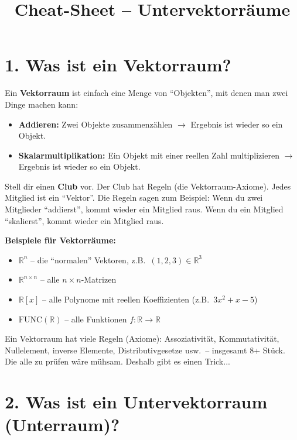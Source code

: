 \documentclass[a4paper,12pt]{article}
\title{Cheat-Sheet -- Untervektorr\"aume}
\author{}
\date{}
\begin{document}
\maketitle

\section*{1. Was ist ein Vektorraum?}

Ein \textbf{Vektorraum} ist einfach eine Menge von ``Objekten'', mit denen man zwei Dinge machen kann:
\begin{itemize}
    \item \textbf{Addieren:} Zwei Objekte zusammenz\"ahlen $\rightarrow$ Ergebnis ist wieder so ein Objekt.
    \item \textbf{Skalarmultiplikation:} Ein Objekt mit einer reellen Zahl multiplizieren $\rightarrow$ Ergebnis ist wieder so ein Objekt.
\end{itemize}

\begin{analogie}
Stell dir einen \textbf{Club} vor. Der Club hat Regeln (die Vektorraum-Axiome). Jedes Mitglied ist ein ``Vektor''. Die Regeln sagen zum Beispiel: Wenn du zwei Mitglieder ``addierst'', kommt wieder ein Mitglied raus. Wenn du ein Mitglied ``skalierst'', kommt wieder ein Mitglied raus.
\end{analogie}

\textbf{Beispiele f\"ur Vektorr\"aume:}
\begin{itemize}
    \item $\mathbb{R}^n$ -- die ``normalen'' Vektoren, z.B.\ $(1, 2, 3) \in \mathbb{R}^3$
    \item $\mathbb{R}^{n \times n}$ -- alle $n \times n$-Matrizen
    \item $\mathbb{R}[x]$ -- alle Polynome mit reellen Koeffizienten (z.B.\ $3x^2 + x - 5$)
    \item $\mathrm{FUNC}(\mathbb{R})$ -- alle Funktionen $f \colon \mathbb{R} \to \mathbb{R}$
\end{itemize}

Ein Vektorraum hat viele Regeln (Axiome): Assoziativit\"at, Kommutativit\"at, Nullelement, inverse Elemente, Distributivgesetze usw.\ -- insgesamt 8+ St\"uck. Die alle zu pr\"ufen w\"are m\"uhsam. Deshalb gibt es einen Trick...

\section*{2. Was ist ein Untervektorraum (Unterraum)?}
\end{document}
